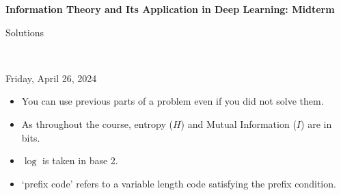 \documentclass[12pt]{article}
\begin{document}
\begin{center}
{\bf Information Theory and Its Application in Deep Learning: Midterm \begin{solution}Solutions\end{solution}} \\ \medskip
\begin{problem}Friday, April 26, 2024 \end{problem}
\end{center}

\begin{problem}
\noindent 
\begin{itemize}
\item You can use previous parts of a problem even if you did not solve them.
\item As throughout the course, entropy ($H$) and Mutual Information ($I$) are in bits.
\item $\log$ is taken in base 2. 
\item `prefix code' refers to a variable length code satisfying the prefix condition.  
\end{itemize}
\end{problem}

\begin{solution}
\end{solution}

\end{document}
